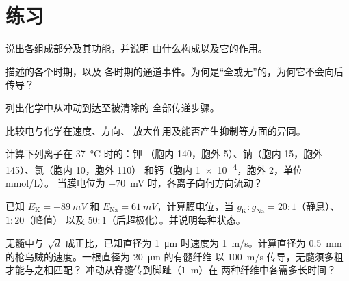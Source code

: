 \section{练习}

\begin{exercise}[$\star$]\label{exo:b2:neurons-synapses:1}
说出各组成部分及其功能，并说明
由什么构成以及它的作用。
\end{exercise}

\begin{exercise}[$\star$]\label{exo:b2:neurons-synapses:2}
描述的各个时期，以及
各时期的通道事件。为何是“全或无”的，为何它不会向后
传导？
\end{exercise}

\begin{exercise}[$\star$]\label{exo:b2:neurons-synapses:3}
列出化学中从冲动到达至被清除的
全部传递步骤。
\end{exercise}

\begin{exercise}[$\star$]\label{exo:b2:neurons-synapses:4}
比较电与化学在速度、方向、
放大作用及能否产生抑制等方面的异同。
\end{exercise}

\begin{exercise}[$\star\star$]\label{exo:b2:neurons-synapses:5}
计算下列离子在 \qty{37}{\celsius} 时的：钾
（胞内 140，胞外 5）、钠（胞内 15，胞外 145）、氯（胞内 10，胞外 110）
和钙（胞内 \qty{1e-4}{}，胞外 2，单位 \unit{mmol/L}）。
当膜电位为 \qty{-70}{mV} 时，各离子向何方向流动？
\end{exercise}

\begin{exercise}[$\star\star$]\label{exo:b2:neurons-synapses:6}
已知 $E_{\mathrm K} = \qty{-89}{mV}$ 和 $E_{\mathrm{Na}} =
\qty{+61}{mV}$，计算膜电位，当 $g_{\mathrm K} :
g_{\mathrm{Na}} = 20 : 1$（静息）、$1 : 20$（峰值）
以及 $50 : 1$（后超极化）。并说明每种状态。
\end{exercise}

\begin{exercise}[$\star\star$]\label{exo:b2:neurons-synapses:7}
无髓中与 $\sqrt d$ 成正比，已知直径为
\qty{1}{\micro m} 时速度为 \qty{1}{m/s}。计算直径为
\qty{0.5}{mm} 的枪乌贼的速度。一根直径为 \qty{20}{\micro m} 的有髓纤维
以 \qty{100}{m/s} 传导，无髓须多粗才能与之相匹配？
冲动从脊髓传到脚趾（\qty{1}{m}）在
两种纤维中各需多长时间？
\end{exercise}

